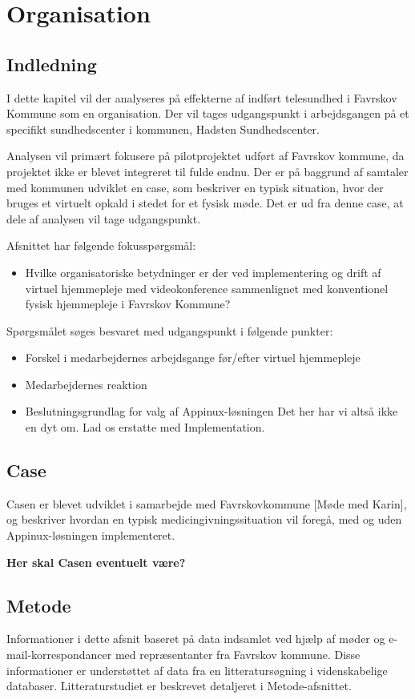 \chapter{Organisation}

\section{Indledning}
I dette kapitel vil der analyseres på effekterne af indført telesundhed i Favrskov Kommune som en organisation. Der vil tages udgangspunkt i arbejdsgangen på et specifikt sundhedscenter i kommunen, Hadsten Sundhedscenter. 

Analysen vil primært fokusere på pilotprojektet udført af Favrskov kommune, da projektet ikke er blevet integreret til fulde endnu. Der er på baggrund af samtaler med kommunen udviklet en case, som beskriver en typisk situation, hvor der bruges et virtuelt opkald i stedet for et fysisk møde. Det er ud fra denne case, at dele af analysen vil tage udgangspunkt.

Afsnittet har følgende fokusspørgsmål:
\begin{itemize}
\item{Hvilke organisatoriske betydninger er der ved implementering og drift af virtuel hjemmepleje med videokonference sammenlignet med konventionel fysisk hjemmepleje i Favrskov Kommune?}
\end{itemize}
Spørgsmålet søges besvaret med udgangspunkt i følgende punkter:
\begin{itemize}
\item{Forskel i medarbejdernes arbejdsgange før/efter virtuel hjemmepleje}
\item{Medarbejdernes reaktion}
\item{Beslutningsgrundlag for valg af Appinux-løsningen Det her har vi altså ikke en dyt om. Lad os erstatte med Implementation.}
\end{itemize}
\section{Case}
Casen er blevet udviklet i samarbejde med Favrskovkommune [Møde med Karin], og beskriver hvordan en typisk medicingivningssituation vil foregå, med og uden Appinux-løsningen implementeret. 

\textbf{Her skal Casen eventuelt være?}
\section{Metode}
Informationer i dette afsnit baseret på data indsamlet ved hjælp af møder og e-mail-korrespondancer med repræsentanter fra Favrskov kommune. Disse informationer er understøttet af data fra en litteratursøgning i videnskabelige databaser. Litteraturstudiet er beskrevet detaljeret i Metode-afsnittet. 

